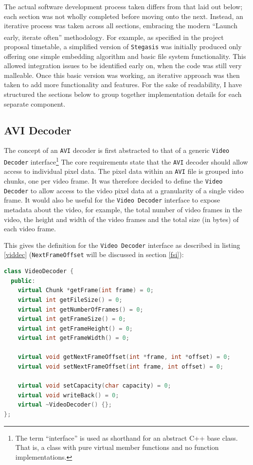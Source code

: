 \documentclass[paper=a4, fontsize=11pt,twoside]{scrartcl}
\numberwithin{table}{section}
\numberwithin{figure}{section}
\numberwithin{algorithm}{section}
\begin{document}
The actual software development process taken differs from that laid out below; each section was not wholly completed before moving onto the next. Instead, an iterative process was taken across all sections, embracing the modern ``Launch early, iterate often'' methodology\textsuperscript{\cite{iterate}}. For example, as specified in the project proposal timetable, a simplified version of \texttt{Stegasis} was initially produced only offering one simple embedding algorithm and basic file system functionality. This allowed integration issues to be identified early on, when the code was still very malleable. Once this basic version was working, an iterative approach was then taken to add more functionality and features. For the sake of readability, I have structured the sections below to group together implementation details for each separate component.

\subsection{AVI Decoder}
\label{avidec}

The concept of an \texttt{AVI} decoder is first abstracted to that of a generic \texttt{Video Decoder} interface\footnote{The term ``interface'' is used as shorthand for an abstract C++ base class. That is, a class with pure virtual member functions and no function implementations.} The core requirements state that the \texttt{AVI} decoder should allow access to individual pixel data. The pixel data within an \texttt{AVI} file is grouped into chunks, one per video frame. It was therefore decided to define the \texttt{Video Decoder} to allow access to the video pixel data at a granularity of a single video frame. It would also be useful for the \texttt{Video Decoder} interface to expose metadata about the video, for example, the total number of video frames in the video, the height and width of the video frames and the total size (in bytes) of each video frame.

This gives the definition for the \texttt{Video Decoder} interface as described in listing \ref{viddec} (\texttt{NextFrameOffset} will be discussed in section \ref{fsi}):

\begin{lstlisting}[language=C++, caption={Video Decoder interface (\texttt{video/video\_decoder.h:15})},frame=single, float,floatplacement=H,label=viddec]
class VideoDecoder {
  public:
    virtual Chunk *getFrame(int frame) = 0;
    virtual int getFileSize() = 0;
    virtual int getNumberOfFrames() = 0;
    virtual int getFrameSize() = 0;
    virtual int getFrameHeight() = 0;
    virtual int getFrameWidth() = 0;
	
    virtual void getNextFrameOffset(int *frame, int *offset) = 0;
    virtual void setNextFrameOffset(int frame, int offset) = 0;
   	   
    virtual void setCapacity(char capacity) = 0;
    virtual void writeBack() = 0;
    virtual ~VideoDecoder() {};
};
\end{lstlisting}
\end{document}
